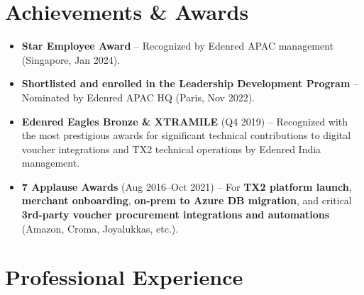 \documentclass[12pt,a4paper]{article}
\begin{document}
\section*{Achievements \& Awards}
\begin{itemize}
    \item \textbf{Star Employee Award} -- Recognized by Edenred APAC management (Singapore, Jan 2024).
    \item \textbf{Shortlisted and enrolled in the Leadership Development Program} -- Nominated by Edenred APAC HQ (Paris, Nov 2022).
    \item \textbf{Edenred Eagles Bronze \& XTRAMILE} (Q4 2019) -- Recognized with the most prestigious awards for significant technical contributions to digital voucher integrations and TX2 technical operations by Edenred India management.
    \item \textbf{7 Applause Awards} (Aug 2016--Oct 2021) -- For \textbf{TX2 platform launch}, \textbf{merchant onboarding}, \textbf{on-prem to Azure DB migration}, and critical \textbf{3rd-party voucher procurement integrations and automations} (Amazon, Croma, Joyalukkas, etc.).
\end{itemize}

\section*{Professional Experience}
\end{document}
